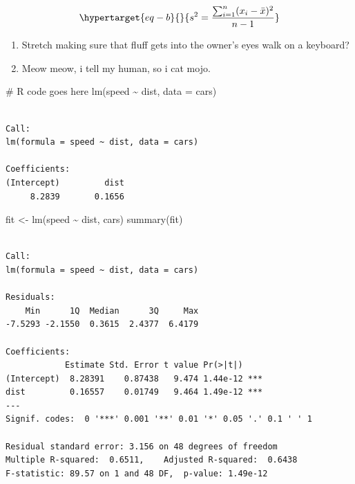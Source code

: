 \documentclass[
  8pt,
  letterpaper,
  DIV=11,
  numbers=noendperiod]{scrartcl}
\newenvironment{Shaded}{\begin{snugshade}}{\end{snugshade}}
\newcommand{\AttributeTok}[1]{\textcolor[rgb]{0.40,0.45,0.13}{#1}}
\newcommand{\CommentTok}[1]{\textcolor[rgb]{0.37,0.37,0.37}{#1}}
\newcommand{\FunctionTok}[1]{\textcolor[rgb]{0.28,0.35,0.67}{#1}}
\newcommand{\NormalTok}[1]{\textcolor[rgb]{0.00,0.23,0.31}{#1}}
\newcommand{\OtherTok}[1]{\textcolor[rgb]{0.00,0.23,0.31}{#1}}
\newcommand{\SpecialCharTok}[1]{\textcolor[rgb]{0.37,0.37,0.37}{#1}}
\providecommand{\tightlist}{%
  \setlength{\itemsep}{0pt}\setlength{\parskip}{0pt}}\usepackage{longtable,booktabs,array}
\begin{document}
\begin{equation}\protect\hypertarget{eq-b}{}{ s^2 = \frac{\sum_{i=1}^n (x_i - \bar{x})^2}{n-1} }\label{eq-b}\end{equation}

\begin{enumerate}
\def\labelenumi{\alph{enumi}.}
\tightlist
\item
  Stretch making sure that fluff gets into the owner's eyes walk on a
  keyboard?
\item
  Meow meow, i tell my human, so i cat mojo.
\end{enumerate}

\begin{Shaded}
\begin{Highlighting}[]
\CommentTok{\# R code goes here}
\FunctionTok{lm}\NormalTok{(speed }\SpecialCharTok{\textasciitilde{}}\NormalTok{ dist, }\AttributeTok{data =}\NormalTok{ cars)}
\end{Highlighting}
\end{Shaded}

\begin{verbatim}

Call:
lm(formula = speed ~ dist, data = cars)

Coefficients:
(Intercept)         dist  
     8.2839       0.1656  
\end{verbatim}

\begin{tcolorbox}[enhanced jigsaw, colframe=quarto-callout-tip-color-frame, leftrule=.75mm, rightrule=.15mm, opacitybacktitle=0.6, colbacktitle=quarto-callout-tip-color!10!white, opacityback=0, left=2mm, breakable, coltitle=black, toprule=.15mm, colback=white, bottomtitle=1mm, title=\textcolor{quarto-callout-tip-color}{\faLightbulb}\hspace{0.5em}{Answer}, toptitle=1mm, titlerule=0mm, arc=.35mm, bottomrule=.15mm]

\begin{Shaded}
\begin{Highlighting}[]
\NormalTok{fit }\OtherTok{\textless{}{-}} \FunctionTok{lm}\NormalTok{(speed }\SpecialCharTok{\textasciitilde{}}\NormalTok{ dist, cars)}
\FunctionTok{summary}\NormalTok{(fit)}
\end{Highlighting}
\end{Shaded}

\begin{verbatim}

Call:
lm(formula = speed ~ dist, data = cars)

Residuals:
    Min      1Q  Median      3Q     Max 
-7.5293 -2.1550  0.3615  2.4377  6.4179 

Coefficients:
            Estimate Std. Error t value Pr(>|t|)    
(Intercept)  8.28391    0.87438   9.474 1.44e-12 ***
dist         0.16557    0.01749   9.464 1.49e-12 ***
---
Signif. codes:  0 '***' 0.001 '**' 0.01 '*' 0.05 '.' 0.1 ' ' 1

Residual standard error: 3.156 on 48 degrees of freedom
Multiple R-squared:  0.6511,    Adjusted R-squared:  0.6438 
F-statistic: 89.57 on 1 and 48 DF,  p-value: 1.49e-12
\end{verbatim}

\end{tcolorbox}
\end{document}
